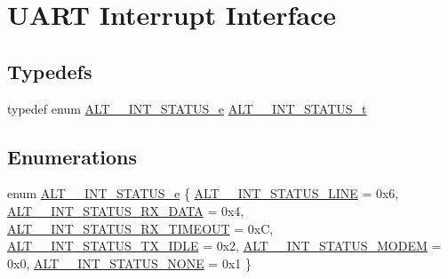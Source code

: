 \hypertarget{group__UART__INT}{}\section{U\+A\+RT Interrupt Interface}
\label{group__UART__INT}
\subsection*{Typedefs}
\begin{DoxyCompactItemize}
\item 
typedef enum \mbox{\hyperlink{group__UART__INT_ga108129e1efabc17da3950f0b654c62d0}{A\+L\+T\+\_\+\_\+\+I\+N\+T\+\_\+\+S\+T\+A\+T\+U\+S\+\_\+e}} \mbox{\hyperlink{group__UART__INT_ga3112f458546736bbc043e8b00662855e}{A\+L\+T\+\_\+\_\+\+I\+N\+T\+\_\+\+S\+T\+A\+T\+U\+S\+\_\+t}}
\end{DoxyCompactItemize}
\subsection*{Enumerations}
\begin{DoxyCompactItemize}
\item 
enum \mbox{\hyperlink{group__UART__INT_ga108129e1efabc17da3950f0b654c62d0}{A\+L\+T\+\_\+\_\+\+I\+N\+T\+\_\+\+S\+T\+A\+T\+U\+S\+\_\+e}} \{ \newline
\mbox{\hyperlink{group__UART__INT_gga108129e1efabc17da3950f0b654c62d0a406992fcb750a0dea86f887048f82ca2}{A\+L\+T\+\_\+\_\+\+I\+N\+T\+\_\+\+S\+T\+A\+T\+U\+S\+\_\+\+L\+I\+NE}} = 0x6, 
\mbox{\hyperlink{group__UART__INT_gga108129e1efabc17da3950f0b654c62d0a4056b5ca53f994d56d537ff8af94e691}{A\+L\+T\+\_\+\_\+\+I\+N\+T\+\_\+\+S\+T\+A\+T\+U\+S\+\_\+\+R\+X\+\_\+\+D\+A\+TA}} = 0x4, 
\mbox{\hyperlink{group__UART__INT_gga108129e1efabc17da3950f0b654c62d0aa14278e2d38b09b9c64f968612bed198}{A\+L\+T\+\_\+\_\+\+I\+N\+T\+\_\+\+S\+T\+A\+T\+U\+S\+\_\+\+R\+X\+\_\+\+T\+I\+M\+E\+O\+UT}} = 0xC, 
\mbox{\hyperlink{group__UART__INT_gga108129e1efabc17da3950f0b654c62d0a7854ba28db6c7b7bbedd40ef32d773d5}{A\+L\+T\+\_\+\_\+\+I\+N\+T\+\_\+\+S\+T\+A\+T\+U\+S\+\_\+\+T\+X\+\_\+\+I\+D\+LE}} = 0x2, 
\newline
\mbox{\hyperlink{group__UART__INT_gga108129e1efabc17da3950f0b654c62d0ac1b80d8a9398386d8322e695f41f1ccd}{A\+L\+T\+\_\+\_\+\+I\+N\+T\+\_\+\+S\+T\+A\+T\+U\+S\+\_\+\+M\+O\+D\+EM}} = 0x0, 
\mbox{\hyperlink{group__UART__INT_gga108129e1efabc17da3950f0b654c62d0a2a38b7cb606028e0f3dcdaaae0f358c6}{A\+L\+T\+\_\+\_\+\+I\+N\+T\+\_\+\+S\+T\+A\+T\+U\+S\+\_\+\+N\+O\+NE}} = 0x1
 \}
\end{DoxyCompactItemize}
